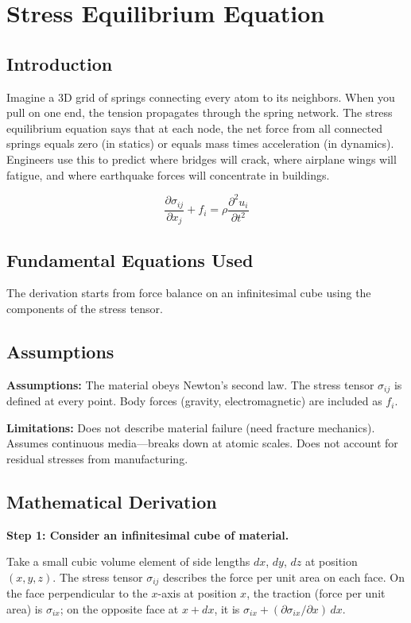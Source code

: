 \chapter{Stress Equilibrium Equation}

\section*{Introduction}

Imagine a 3D grid of springs connecting every atom to its neighbors. When you pull on one end, the tension propagates through the spring network. The stress equilibrium equation says that at each node, the net force from all connected springs equals zero (in statics) or equals mass times acceleration (in dynamics). Engineers use this to predict where bridges will crack, where airplane wings will fatigue, and where earthquake forces will concentrate in buildings.


\[
\frac{\partial \sigma_{ij}}{\partial x_j} + f_i = \rho \frac{\partial^2 u_i}{\partial t^2}
\]

\section*{Fundamental Equations Used}

The derivation starts from force balance on an infinitesimal cube using the components of the stress tensor.

\section*{Assumptions}

\textbf{Assumptions:} The material obeys Newton's second law. The stress tensor $\sigma_{ij}$ is defined at every point. Body forces (gravity, electromagnetic) are included as $f_i$.


\textbf{Limitations:} Does not describe material failure (need fracture mechanics). Assumes continuous media---breaks down at atomic scales. Does not account for residual stresses from manufacturing.


\section*{Mathematical Derivation}

\textbf{Step 1: Consider an infinitesimal cube of material.}

Take a small cubic volume element of side lengths $dx$, $dy$, $dz$ at position $(x, y, z)$. The stress tensor $\sigma_{ij}$ describes the force per unit area on each face. On the face perpendicular to the $x$-axis at position $x$, the traction (force per unit area) is $\sigma_{ix}$; on the opposite face at $x + dx$, it is $\sigma_{ix} + (\partial\sigma_{ix}/\partial x)\,dx$.

